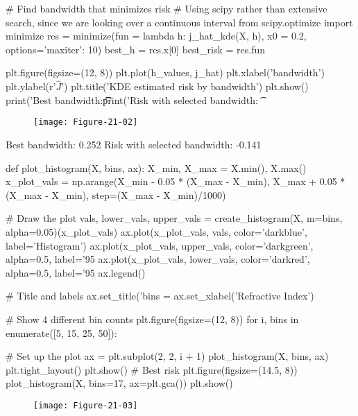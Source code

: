 \begin{python}
# Find bandwidth that minimizes risk
# Using scipy rather than extensive search, since we are looking over a continuous interval
from scipy.optimize import minimize
res = minimize(fun = lambda h: j_hat_kde(X, h), x0 = 0.2, options={'maxiter': 10})
best_h = res.x[0]
best_risk = res.fun
\end{python}

\begin{python}
plt.figure(figsize=(12, 8))
plt.plot(h_values, j_hat)
plt.xlabel('bandwidth')
plt.ylabel(r'$\hat{J}$')
plt.title('KDE estimated risk by bandwidth')
plt.show()
print('Best bandwidth:\t\t\t%
print('Risk with selected bandwidth: \t%
\end{python}

\begin{figure}[H]
\centering
\texttt{[image: Figure-21-02]}
\end{figure}

    
\begin{console}
Best bandwidth:                 0.252
Risk with selected bandwidth:   -0.141
\end{console}

\begin{python}
def plot_histogram(X, bins, ax):
    X_min, X_max = X.min(), X.max()
    x_plot_vals = np.arange(X_min - 0.05 * (X_max - X_min), X_max + 0.05 * (X_max - X_min), 
        step=(X_max - X_min)/1000)
    
    # Draw the plot
    vals, lower_vals, upper_vals = create_histogram(X, m=bins, alpha=0.05)(x_plot_vals)
    ax.plot(x_plot_vals, vals, color='darkblue', label='Histogram')
    ax.plot(x_plot_vals, upper_vals, color='darkgreen', alpha=0.5, label='95%
    ax.plot(x_plot_vals, lower_vals, color='darkred', alpha=0.5, label='95%
    ax.legend()
    
    # Title and labels
    ax.set_title('bins = %
    ax.set_xlabel('Refractive Index')
    
# Show 4 different bin counts
plt.figure(figsize=(12, 8))
for i, bins in enumerate([5, 15, 25, 50]):
    
    # Set up the plot
    ax = plt.subplot(2, 2, i + 1)
    plot_histogram(X, bins, ax)
plt.tight_layout()
plt.show()
# Best risk
plt.figure(figsize=(14.5, 8))
plot_histogram(X, bins=17, ax=plt.gca())
plt.show()
\end{python}

\begin{figure}[H]
\centering
\texttt{[image: Figure-21-03]}
\end{figure}

